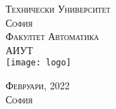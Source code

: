 \begin{titlepage}


	\vspace{0.5cm}
	\textsc{\LARGE Технически Университет\\
        София\\[0.3cm]
        	\vspace{0.5cm}
		\large Факултет Автоматика\\
        АИУТ}\\[0.5cm]
	\texttt{[image: logo]}




        \textsc{Февруари, 2022\\
        София}






\end{titlepage}
